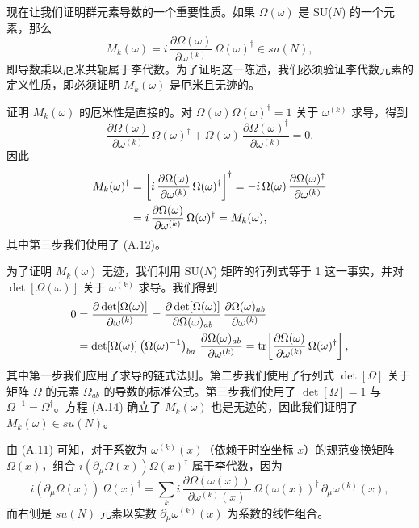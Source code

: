 现在让我们证明群元素导数的一个重要性质。如果 $\Omega(\omega)$ 是 SU($N$) 的一个元素，那么
\begin{equation}
  M_k(\omega) = i\,\frac{\partial\Omega(\omega)}{\partial\omega^{(k)}}\,
  \Omega(\omega)^\dagger \in su(N),
\end{equation}
即导数乘以厄米共轭属于李代数。为了证明这一陈述，我们必须验证李代数元素的定义性质，即必须证明 $M_k(\omega)$ 是厄米且无迹的。

证明 $M_k(\omega)$ 的厄米性是直接的。对 $\Omega(\omega)\Omega(\omega)^\dagger = 1$ 关于 $\omega^{(k)}$ 求导，得到
\begin{equation}
  \frac{\partial\Omega(\omega)}{\partial\omega^{(k)}}\,\Omega(\omega)^\dagger
  + \Omega(\omega)\,\frac{\partial\Omega(\omega)^\dagger}{\partial\omega^{(k)}} = 0.
\end{equation}
因此
\begin{align}
  M_k(\omega)^\dagger &=
  \left[ i\,\frac{\partial\Omega(\omega)}{\partial\omega^{(k)}}\,
  \Omega(\omega)^\dagger \right]^\dagger
  = -i\,\Omega(\omega)\,\frac{\partial\Omega(\omega)^\dagger}{\partial\omega^{(k)}} \notag\\
  &= i\,\frac{\partial\Omega(\omega)}{\partial\omega^{(k)}}\,
  \Omega(\omega)^\dagger = M_k(\omega),
\end{align}
其中第三步我们使用了 (A.12)。

为了证明 $M_k(\omega)$ 无迹，我们利用 SU($N$) 矩阵的行列式等于 1 这一事实，并对 $\det[\Omega(\omega)]$ 关于 $\omega^{(k)}$ 求导。我们得到
\begin{align}
  0 &= \frac{\partial\det[\Omega(\omega)]}{\partial\omega^{(k)}}
  = \frac{\partial\det[\Omega(\omega)]}{\partial\Omega(\omega)_{ab}}\,
  \frac{\partial\Omega(\omega)_{ab}}{\partial\omega^{(k)}} \notag\\
  &= \det[\Omega(\omega)]\left(\Omega(\omega)^{-1}\right)_{ba}\,
  \frac{\partial\Omega(\omega)_{ab}}{\partial\omega^{(k)}}
  = \operatorname{tr}\!\left[\frac{\partial\Omega(\omega)}{\partial\omega^{(k)}}\,
  \Omega(\omega)^\dagger\right],
\end{align}
其中第一步我们应用了求导的链式法则。第二步我们使用了行列式 $\det[\Omega]$ 关于矩阵 $\Omega$ 的元素 $\Omega_{ab}$ 的导数的标准公式。第三步我们使用了 $\det[\Omega] = 1$ 与 $\Omega^{-1} = \Omega^\dagger$。方程 (A.14) 确立了 $M_k(\omega)$ 也是无迹的，因此我们证明了 $M_k(\omega)\in su(N)$。

由 (A.11) 可知，对于系数为 $\omega^{(k)}(x)$（依赖于时空坐标 $x$）的规范变换矩阵 $\Omega(x)$，组合 $i(\partial_\mu\Omega(x))\Omega(x)^\dagger$ 属于李代数，因为
\begin{equation}
  i(\partial_\mu\Omega(x))\,\Omega(x)^\dagger
  = \sum_k i\,\frac{\partial\Omega(\omega(x))}{\partial\omega^{(k)}(x)}\,
  \Omega(\omega(x))^\dagger\,\partial_\mu\omega^{(k)}(x),
\end{equation}
而右侧是 $su(N)$ 元素以实数 $\partial_\mu\omega^{(k)}(x)$ 为系数的线性组合。

